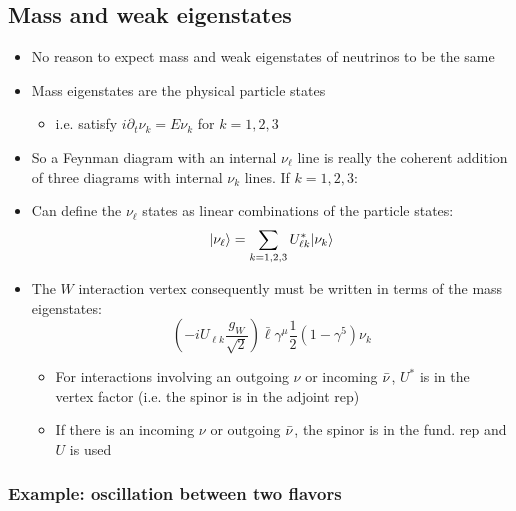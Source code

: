 \subsection{Mass and weak eigenstates}
\begin{itemize}
  \item No reason to expect mass and weak eigenstates of neutrinos to be the same
  \item Mass eigenstates are the physical particle states
  \begin{itemize}
    \item i.e. satisfy $i \partial_t\nu_k = E\nu_k$ for $k=1,2,3$
  \end{itemize}
  \item So a Feynman diagram with an internal $\nu_\ell$ line is really the coherent addition of three diagrams with internal $\nu_k$ lines. If $k=1,2,3$: 
  \item Can define the $\nu_\ell$ states as linear combinations of the particle states:
  \begin{equation}
    |\nu_\ell\rangle = \sum_{k=1,2,3} U^*_{\ell k} |\nu_k\rangle
  \end{equation}
  \item The $W$ interaction vertex consequently must be written in terms of the mass eigenstates:
  \begin{equation}
    \left(-i U_{\ell k} \frac{g_W}{\sqrt{2}}\right) \bar\ell \gamma^\mu \frac{1}{2} (1-\gamma^5) \nu_k
  \end{equation}
  \begin{itemize}
    \item For interactions involving an outgoing $\nu$ or incoming ${\bar{\nu}}$, $U^*$ is in the vertex factor (i.e. the spinor is in the adjoint rep)
    \item If there is an incoming $\nu$ or outgoing ${\bar{\nu}}$, the spinor is in the fund. rep and $U$ is used
  \end{itemize}
\end{itemize}

\subsubsection{Example: oscillation between two flavors}

